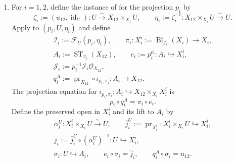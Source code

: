 \begin{definition}
\begin{enumerate}
      \[
        p_i:=\operatorname{pr}_i\circ c_{12}\colon X_{12}\to X_i,
        \qquad
        u_{12}:=\gamma_{12}^{\mathrm{im}}\colon U\to X_{12},
        \qquad
        c_{12}\circ u_{12}=\gamma_{12}.                           \tag{CM0c'}
      \]
      Stability of separatedness and finite type under base change and
      composition, applied to the closed immersion \(c_{12}\) and the two
      projections, is the predicate pair
      \[
        \operatorname{Separated}(p_i),\qquad
        \operatorname{FiniteType}(p_i).
      \]
    \item For \(i=1,2\), define the instance of
       for the projection
      \(p_i\) by
      \[
        \zeta_i:=(u_{12},\operatorname{id}_U)\colon
          U\xrightarrow{\sim}X_{12}\times_{X_i}U,\qquad
        \eta_i:=\zeta_i^{-1}\colon
          X_{12}\times_{X_i}U\xrightarrow{\sim}U.                 \tag{CM0d}
      \]
      Apply
       to $(p_i,U,\eta_i)$ and
      define
      \[
      \begin{gathered}
        \mathcal I_i:=\mathcal F_U(p_i,\eta_i),\qquad
        \pi_i\colon X_i^i:=
          \operatorname{Bl}_{\mathcal I_i}(X_i)\to X_i,\\
        A_i:=\operatorname{ST}_{\pi_i}(X_{12}),\qquad
        e_i:=p_i^{\mathrm{el}}\colon A_i\hookrightarrow X_i^i,\\
        \mathcal J_i:=p_i^{-1}\mathcal I_i\mathcal O_{X_{12}},\\
        q_i^A:=\operatorname{pr}_{X_{12}}\circ\iota_{p_i,\pi_i}
          \colon A_i\longrightarrow X_{12}.
      \end{gathered}
      \]
      The projection equation for
      \(\iota_{p_i,\pi_i}\colon
        A_i\hookrightarrow X_{12}\times_{X_i}X_i^i\) is
      \[
        p_i\circ q_i^A=\pi_i\circ e_i.
      \]
      Define the preserved open in \(X_i^i\) and its lift to \(A_i\) by
      \[
      \begin{gathered}
        \alpha_i^U\colon X_i^i\times_{X_i}U\xrightarrow{\sim}U,\qquad
        \overline j_i^U:=\operatorname{pr}_{X_i^i}
          \colon X_i^i\times_{X_i}U\hookrightarrow X_i^i,\\
        \widetilde j_i:=
          \overline j_i^U\circ(\alpha_i^U)^{-1}
          \colon U\hookrightarrow X_i^i,\\
        \sigma_i\colon U\hookrightarrow A_i,\qquad
        e_i\circ\sigma_i=\widetilde j_i,\qquad
        q_i^A\circ\sigma_i=u_{12}.
      \end{gathered}                                                \tag{CM0c}
\]
\end{enumerate}
\end{definition}
